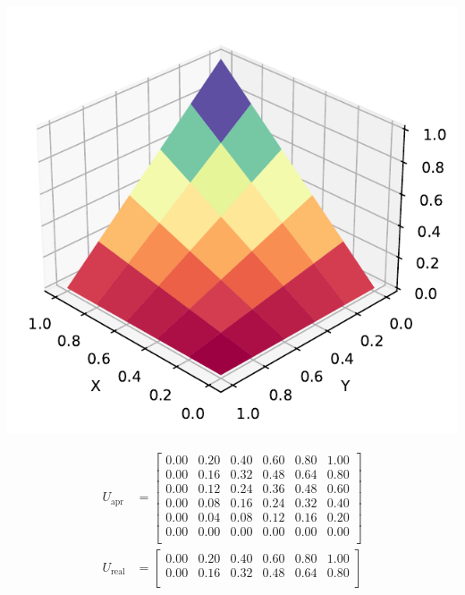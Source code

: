 \documentclass[a4paper, 11pt]{report}
\begin{document}
\begin{enumerate}[leftmargin=*]
\begin{enumerate}[leftmargin=*, label=\alph*.]
        \begin{minipage}{0.35\columnwidth}
            \includegraphics[width=\columnwidth]{../edp/12.1_3a.pdf}
        \end{minipage}
        \begin{minipage}{0.6\columnwidth}
            \begin{align*}
                U_{\text{apr}} &= 
                \begin{bmatrix}
                    0.00 & 0.20 & 0.40 & 0.60 & 0.80 & 1.00\\ 
                    0.00 & 0.16 & 0.32 & 0.48 & 0.64 & 0.80 \\ 
                    0.00 & 0.12 & 0.24 & 0.36 & 0.48 & 0.60 \\ 
                    0.00 & 0.08 & 0.16 & 0.24 & 0.32 & 0.40 \\ 
                    0.00 & 0.04 & 0.08 & 0.12 & 0.16 & 0.20 \\ 
                    0.00 & 0.00 & 0.00 & 0.00 & 0.00 & 0.00 \\ 
                \end{bmatrix}\\
                U_{\text{real}} &=
                \begin{bmatrix}
                    0.00 & 0.20 & 0.40 & 0.60 & 0.80 & 1.00\\ 
                    0.00 & 0.16 & 0.32 & 0.48 & 0.64 & 0.80 \\ 

\end{bmatrix}
\end{align*}
\end{minipage}
\end{enumerate}
\end{enumerate}
\end{document}
